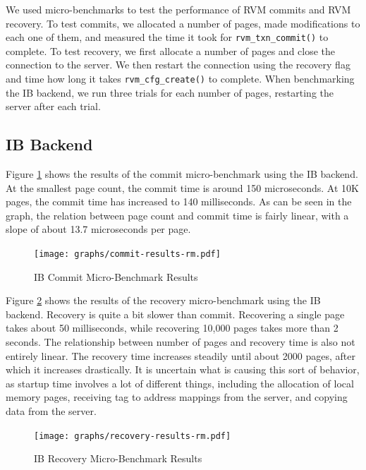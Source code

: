 We used micro-benchmarks to test the performance of RVM commits and RVM
recovery. To test commits, we allocated a number of pages, made modifications
to each one of them, and measured the time it took for \verb|rvm_txn_commit()|
to complete. To test recovery, we first allocate a number of pages and
close the connection to the server. We then restart the connection using the
recovery flag and time how long it takes \verb|rvm_cfg_create()| to complete.
When benchmarking the IB backend, we run three trials for each number of pages,
restarting the server after each trial.

\subsection{IB Backend}
Figure \ref{fig:ib-commit-ubm} shows the results of the commit micro-benchmark
using the IB backend. At the smallest page count, the commit time is around
150 microseconds. At 10K pages, the commit time has increased to 140 milliseconds.
As can be seen in the graph, the relation between page count and commit time
is fairly linear, with a slope of about 13.7 microseconds per page.

\begin{figure}[h]
    \caption{IB Commit Micro-Benchmark Results}
    \texttt{[image: graphs/commit-results-rm.pdf]}
    \label{fig:ib-commit-ubm}
\end{figure}

Figure \ref{fig:ib-recovery-ubm} shows the results of the recovery
micro-benchmark using the IB backend. Recovery is quite a bit slower than
commit. Recovering a single page takes about 50 milliseconds, while recovering
10,000 pages takes more than 2 seconds. The relationship between number of
pages and recovery time is also not entirely linear.
The recovery time increases steadily until about 2000 pages, after which it
increases drastically. It is uncertain what is causing this sort of behavior,
as startup time involves a lot of different things, including the allocation
of local memory pages, receiving tag to address mappings from the server, and
copying data from the server.

\begin{figure}[h]
    \caption{IB Recovery Micro-Benchmark Results}
    \texttt{[image: graphs/recovery-results-rm.pdf]}
    \label{fig:ib-recovery-ubm}
\end{figure}

